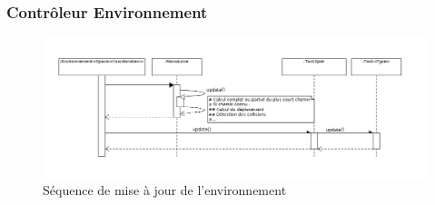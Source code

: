 \subsubsection{Contrôleur Environnement}

\begin{figure}[!h]\centering
   \includegraphics[scale=0.5]{images/seq_environnement.png}
   \caption{\label{seq_init} Séquence de mise à jour de l'environnement}
\end{figure}



